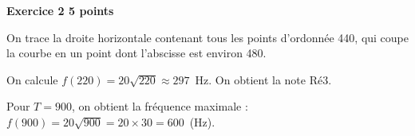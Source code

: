 \textbf{Exercice 2 \hfill 5 points}

\medskip

%  
%
%
% 
%
%
%
%
 

On trace la droite horizontale contenant tous les points d’ordonnée 440, qui coupe la courbe en un point dont l’abscisse est environ 480.

On calcule $f(220) = 20 \sqrt{220} \approx 297$~Hz. On obtient la note Ré3.
 
 
Pour $T = 900$, on obtient la fréquence maximale : $f(900) = 20 \sqrt{900} = 20 \times 30 = 600$~(Hz).

\bigskip

